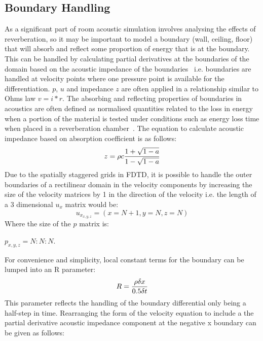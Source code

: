\subsection{Boundary Handling}
As a significant part of room acoustic simulation involves analysing the effects of reverberation, so it may be important to model a boundary (wall, ceiling, floor) that will absorb and reflect some proportion of energy that is at the boundary. This can be handled by calculating partial derivatives at the boundaries of the domain based on the acoustic impedance of the boundaries~\cite{Olesen1997}\cite{Hill2012} i.e. boundaries are handled at velocity points where one pressure point is available for the differentiation. $p$, $u$ and impedance $z$ are often applied in a relationship similar to Ohms law $v = i * r $. The absorbing and reflecting properties of boundaries in acoustics are often defined as normalised quantities related to the loss in energy when a portion of the material is tested under conditions such as energy loss time when placed in a reverberation chamber~\cite{Beranek2006}. The equation to calculate acoustic impedance based on absorption coefficient is as follows:\\
\begin{equation}
z = \rho c \frac{1 + \sqrt{1 - a}}{1 - \sqrt{1 - a}} \\
\end{equation}
Due to the spatially staggered grids in FDTD, it is possible to handle the outer boundaries of a rectilinear domain in the velocity components by increasing the size of the velocity matrices by 1 in the direction of the velocity i.e. the length of a 3 dimensional $u_x$ matrix would be:\\
\begin{equation}
u_{x_{x,y,z}} = (x = N+1, y = N, z = N)
\end{equation} Where the size of the $p$ matrix is:\\
\begin{center}
 $p_{x,y,z} = N:N:N$. 
\end{center}
For convenience and simplicity, local constant terms for the boundary can  be lumped into an R parameter:\\
\begin{equation}
R = \frac{\rho \delta x}{0.5 \delta t}\\
\end{equation} 
This parameter reflects the handling of the boundary differential only being a half-step in time. Rearranging the form of the velocity equation to include a the partial derivative acoustic impedance component at the negative x boundary can be given as follows:\\
